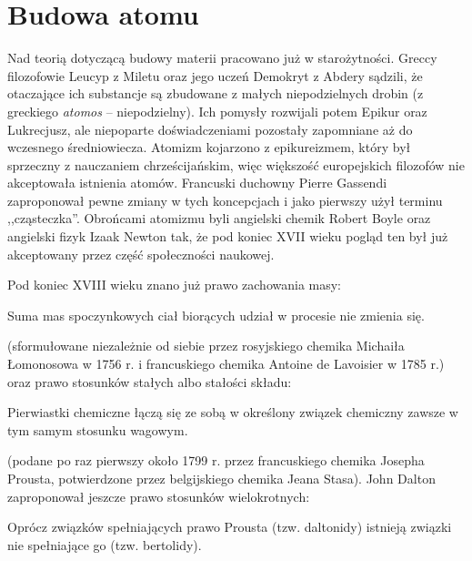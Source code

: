
\section{Budowa atomu}
Nad teorią dotyczącą budowy materii pracowano już w starożytności.
Greccy filozofowie Leucyp z Miletu oraz jego uczeń Demokryt z Abdery sądzili, że otaczające ich substancje są zbudowane z małych niepodzielnych drobin (z greckiego \emph{atomos} -- niepodzielny).
%
%
Ich pomysły rozwijali potem Epikur oraz Lukrecjusz, ale niepoparte doświadczeniami pozostały zapomniane aż do wczesnego średniowiecza.
%
%
Atomizm kojarzono z epikureizmem, który był sprzeczny z nauczaniem chrześcijańskim, więc większość europejskich filozofów nie akceptowała istnienia atomów.
Francuski duchowny Pierre Gassendi zaproponował pewne zmiany w tych koncepcjach i jako pierwszy użył terminu ,,cząsteczka''.
%
Obrońcami atomizmu byli angielski chemik Robert Boyle oraz angielski fizyk Izaak Newton tak, że pod koniec XVII wieku pogląd ten był już akceptowany przez część społeczności naukowej.
%
%

Pod koniec XVIII wieku znano już prawo zachowania masy:
\begin{theorem}
	Suma mas spoczynkowych ciał biorących udział w procesie nie zmienia się.
\end{theorem}
(sformułowane niezależnie od siebie przez rosyjskiego chemika Michaiła Łomonosowa w 1756 r. i francuskiego chemika Antoine de Lavoisier w 1785 r.) oraz prawo stosunków stałych albo stałości składu:
%
%
\begin{theorem}
	Pierwiastki chemiczne łączą się ze sobą w określony związek chemiczny zawsze w tym samym stosunku wagowym.
\end{theorem}
(podane po raz pierwszy około 1799 r. przez francuskiego chemika Josepha Prousta, potwierdzone przez belgijskiego chemika Jeana Stasa).
%
%
John Dalton zaproponował jeszcze prawo stosunków wielokrotnych:
%

\begin{tcolorbox}[title={Do zrobienia poźniej}]
Oprócz związków spełniających prawo Prousta (tzw. daltonidy) istnieją związki nie spełniające go (tzw. bertolidy).
\end{tcolorbox}

